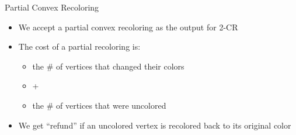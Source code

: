 \begin{frame}{Partial Convex Recoloring}
\begin{itemize}

\item
We accept a partial convex recoloring as the output for 2-CR  

\pause\item
The cost of a partial recoloring is:
	\begin{itemize}
	\pause\item
	the \# of vertices that changed their colors
	\pause\item
	+ 
	\pause\item	
	the \# of vertices that were uncolored
	\end{itemize}

\pause\item
We get ``refund'' if an uncolored vertex is recolored back to its original color 

\end{itemize}
\end{frame}
